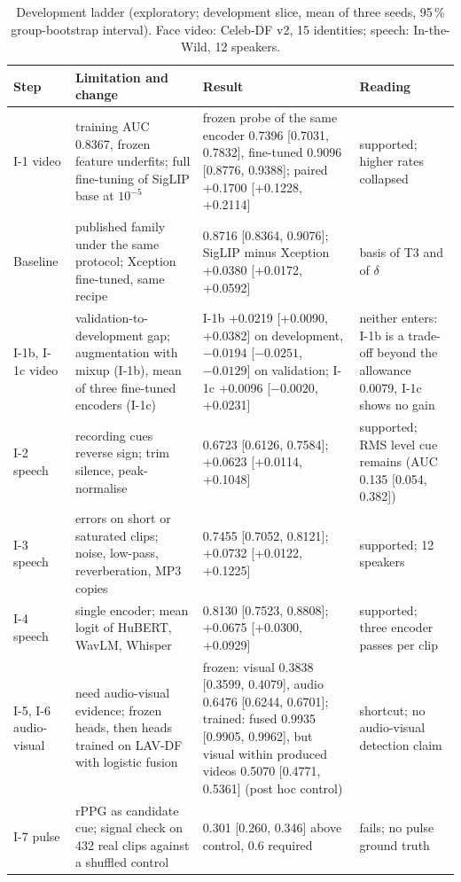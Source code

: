 \documentclass[conference,a4paper]{IEEEtran_nodash}
\begin{document}
\begin{table}[!t]
\centering
\caption[Development ladder]{Development ladder (exploratory; development slice,
mean of three seeds, 95\,\% group-bootstrap interval). Face video: Celeb-DF v2,
15 identities; speech: In-the-Wild, 12 speakers.}
\label{tab:ladder}
\footnotesize
\setlength{\tabcolsep}{3pt}
\begin{tabular}{@{}L{1.7cm} L{4.4cm} L{7.2cm} L{4.0cm}@{}}
\toprule
Step & Limitation and change & Result & Reading \\
\midrule
I-1 video & training AUC 0.8367, frozen feature underfits; full fine-tuning of SigLIP base at $10^{-5}$ &
frozen probe of the same encoder 0.7396 [0.7031, 0.7832], fine-tuned 0.9096 [0.8776, 0.9388]; paired +0.1700 [+0.1228, +0.2114] &
supported; higher rates collapsed \\
Baseline & published family under the same protocol; Xception fine-tuned, same recipe &
0.8716 [0.8364, 0.9076]; SigLIP minus Xception +0.0380 [+0.0172, +0.0592] &
basis of T3 and of $\delta$ \\
I-1b, I-1c video & validation-to-development gap; augmentation with mixup (I-1b), mean of three fine-tuned encoders (I-1c) &
I-1b +0.0219 [+0.0090, +0.0382] on development, $-0.0194$ [$-0.0251$, $-0.0129$] on validation; I-1c +0.0096 [$-0.0020$, +0.0231] &
neither enters: I-1b is a trade-off beyond the allowance 0.0079, I-1c shows no gain \\
\midrule
I-2 speech & recording cues reverse sign; trim silence, peak-normalise &
0.6723 [0.6126, 0.7584]; +0.0623 [+0.0114, +0.1048] &
supported; RMS level cue remains (AUC 0.135 [0.054, 0.382]) \\
I-3 speech & errors on short or saturated clips; noise, low-pass, reverberation, MP3 copies &
0.7455 [0.7052, 0.8121]; +0.0732 [+0.0122, +0.1225] &
supported; 12 speakers \\
I-4 speech & single encoder; mean logit of HuBERT, WavLM, Whisper &
0.8130 [0.7523, 0.8808]; +0.0675 [+0.0300, +0.0929] &
supported; three encoder passes per clip \\
\midrule
I-5, I-6 audio-visual & need audio-visual evidence; frozen heads, then heads trained on LAV-DF with logistic fusion &
frozen: visual 0.3838 [0.3599, 0.4079], audio 0.6476 [0.6244, 0.6701]; trained: fused 0.9935 [0.9905, 0.9962], but visual within produced videos 0.5070 [0.4771, 0.5361] (post hoc control) &
shortcut; no audio-visual detection claim \\
I-7 pulse & rPPG as candidate cue; signal check on 432 real clips against a shuffled control &
0.301 [0.260, 0.346] above control, 0.6 required &
fails; no pulse ground truth \\
\bottomrule
\end{tabular}
\end{table}
\end{document}
